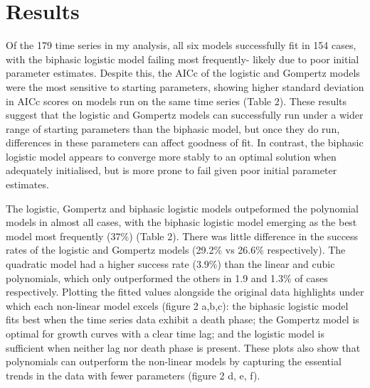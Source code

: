 \documentclass{article}
\begin{document}
\section{Results}

Of the 179 time series in my analysis, all six models successfully fit in 154 cases, with the biphasic logistic model failing most frequently- likely due to poor initial parameter estimates. Despite this, the AICc of the logistic and Gompertz models were the most sensitive to starting parameters, showing higher standard deviation in AICc scores on models run on the same time series (Table 2). These results suggest that the logistic and Gompertz models can successfully run under a wider range of starting parameters than the biphasic model, but once they do run, differences in these parameters can affect goodness of fit. In contrast, the biphasic logistic model appears to converge more stably to an optimal solution when adequately initialised, but is more prone to fail given poor initial parameter estimates.

The logistic, Gompertz and biphasic logistic models outpeformed the polynomial models in almost all cases, with the biphasic logistic model emerging as the best model most frequently (37\%) (Table 2).  There was little difference in the success rates of the logistic and Gompertz models (29.2\% vs 26.6\% respectively). The quadratic model had a higher success rate (3.9\%) than the linear and cubic polynomials, which only outperformed the others in 1.9 and 1.3\% of cases respectively. Plotting the fitted values alongside the original data highlights under which each non-linear model excels (figure 2 a,b,c): the biphasic logistic model fits best when the time series data exhibit a death phase; the Gompertz model is optimal for growth curves with a clear time lag; and the logistic model is sufficient when neither lag nor death phase is present. These plots also show that polynomials can outperform the non-linear models by capturing the essential trends in the data with fewer parameters (figure 2 d, e, f).
\end{document}
